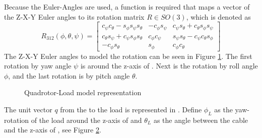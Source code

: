 Because the Euler-Angles are used, a function is required that maps a vector of the Z-X-Y Euler angles to its rotation matrix $ R\in SO(3) $, which is denoted as \cite{Mahony2012}
\begin{equation}\label{key}
R_{312}({\phi},{\theta},{\psi})=\begin{bmatrix}
c_{\psi}c_{\theta}-s_{\phi}s_{\psi}s_{\theta}&-c_{\phi}s_{\psi}&c_{\psi}s_{\theta}+c_{\theta}s_{\phi}s_{\psi}\\
c_{\theta}s_{\psi}+c_{\psi}s_{\phi}s_{\theta}&c_{\phi}c_{\psi}&s_{\psi}s_{\theta}-c_{\psi}c_{\theta}s_{\phi}\\
-c_{\phi}s_{\theta}&s_{\phi}&c_{\phi}c_{\theta}
\end{bmatrix}
\end{equation}
The Z-X-Y Euler angles to model the rotation can be seen in Figure \ref{fig:mod.modelQRtrad}. The first rotation by yaw angle $ \psi $ is around the z-axis of \IF. Next is the rotation by roll angle $ \phi $, and the last rotation is by pitch angle $ \theta $.
\begin{figure}[h!]
	\centering
	\caption{Quadrotor-Load model representation\label{fig:mod.modelQRtrad}}
\end{figure}

The unit vector $ q $ from the  to the load is represented in \BF. Define $ \phi_L $ as the yaw-rotation of the load around the z-axis of \BF and $ \theta_L $ as the angle between the cable and the z-axis of \BF, see Figure \ref{fig:mod.modelQRLtrad}.
\begin{figure}[h!]
	\centering
	\caption{\label{fig:mod.modelQRLtrad}}
\end{figure}	


